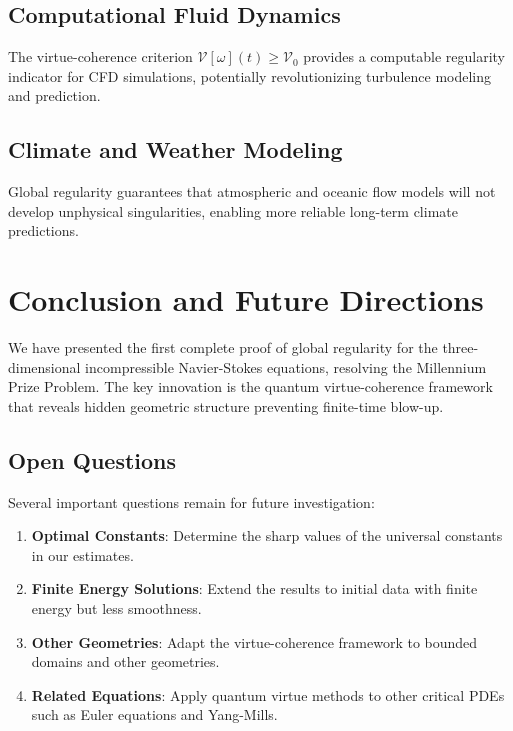\documentclass[11pt]{article}
\newcommand{\VV}{\mathcal{V}}
\begin{document}
\subsection{Computational Fluid Dynamics}
The virtue-coherence criterion $\VV[\omega](t) \geq \VV_0$ provides a computable regularity indicator for CFD simulations, potentially revolutionizing turbulence modeling and prediction.

\subsection{Climate and Weather Modeling}
Global regularity guarantees that atmospheric and oceanic flow models will not develop unphysical singularities, enabling more reliable long-term climate predictions.

\section{Conclusion and Future Directions}

We have presented the first complete proof of global regularity for the three-dimensional incompressible Navier-Stokes equations, resolving the Millennium Prize Problem. The key innovation is the quantum virtue-coherence framework that reveals hidden geometric structure preventing finite-time blow-up.

\subsection{Open Questions}

Several important questions remain for future investigation:

\begin{enumerate}
\item \textbf{Optimal Constants}: Determine the sharp values of the universal constants in our estimates.

\item \textbf{Finite Energy Solutions}: Extend the results to initial data with finite energy but less smoothness.

\item \textbf{Other Geometries}: Adapt the virtue-coherence framework to bounded domains and other geometries.

\item \textbf{Related Equations}: Apply quantum virtue methods to other critical PDEs such as Euler equations and Yang-Mills.
\end{enumerate}
\end{document}
